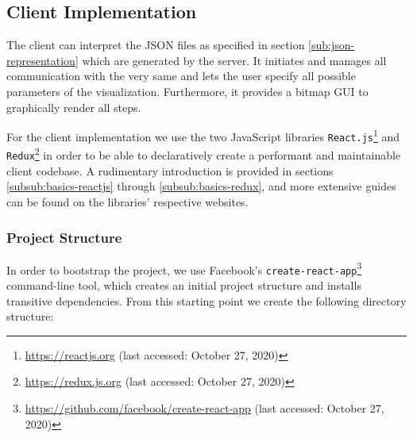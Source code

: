 \newpage

\subsection{Client Implementation}
The client can interpret the JSON files as specified in section \ref{sub:json-representation} which are generated by the server. It initiates and manages all communication with the very same and lets the user specify all possible parameters of the visualization. Furthermore, it provides a bitmap GUI to graphically render all steps.

For the client implementation we use the two JavaScript libraries \texttt{React.js}\footnote{\url{https://reactjs.org} (last accessed: October 27, 2020)} and \texttt{Redux}\footnote{\url{https://redux.js.org} (last accessed: October 27, 2020)} in order to be able to declaratively create a performant and maintainable client codebase. A rudimentary introduction is provided in sections \ref{subsub:basics-reactjs} through \ref{subsub:basics-redux}, and more extensive guides can be found on the libraries' respective websites.

\subsubsection{Project Structure} 
In order to bootstrap the project, we use Facebook's \texttt{create-react-app}\footnote{\url{https://github.com/facebook/create-react-app} (last accessed: October 27, 2020)} command-line tool, which creates an initial project structure and installs transitive dependencies. From this starting point we create the following directory structure:

